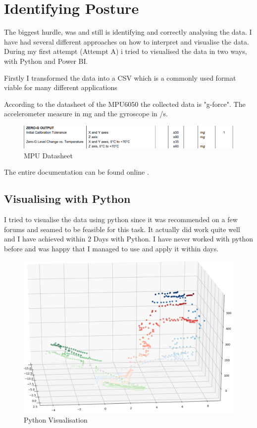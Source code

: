\section{Identifying Posture}

The biggest hurdle, was and still is identifying and correctly analysing the data. I have had several different approaches on how to interpret and visualise the data. During my first attempt (Attempt A) i tried to visualised the data in two ways, with Python and Power BI.

Firstly I transformed the data into a CSV which is a commonly used format viable for many different applications

According to the datasheet of the MPU6050 the collected data is "g-force". The accelerometer measure in mg and the gyroscope in \degree/s. 

\begin{figure}[h]
\begin{center}
\includegraphics[width=\linewidth]{images/MPU6050_DATA.png}
  \end{center}
  \caption{MPU Datasheet}
  \label{fig:MPUDatasheet}
\end{figure}

The entire documentation can be found online \cite{MPU6000D59:online}.

\subsection{Visualising with Python}

I tried to visualise the data using python since it was recommended on a few forums and seamed to be feasible for this task. It actually did work quite well and I have achieved within 2 Days with Python. I have never worked with python before and was happy that I managed to use and apply it within days. 

\begin{figure}[h]
\begin{center}
\includegraphics[width=0.6\linewidth]{images/PyVisualisation.png}
  \end{center}
  \caption{Python Visualisation}
  \label{fig:PythonVisualisation}
\end{figure}

